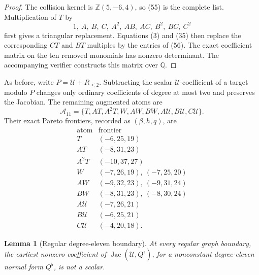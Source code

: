 \documentclass[11pt]{article}
\newtheorem{lemma}[theorem]{Lemma}
\theoremstyle{remark}
\newcommand{\Z}{\mathbb Z}
\newcommand{\Jac}{\operatorname{Jac}}
\newcommand{\cU}{\mathcal U}
\begin{document}
\begin{proof}
The collision kernel is \(\Z(5,-6,4)\), so (55) is the complete list.
Multiplication of \(T\) by
\[
1,\ A,\ B,\ C,\ A^2,\ AB,\ AC,\ B^2,\ BC,\ C^2
\]
first gives a triangular replacement.  Equations (3) and (35) then
replace the corresponding \(CT\) and \(BT\) multiples by the entries
of (56).  The exact coefficient matrix on the ten removed monomials has
nonzero determinant.  The accompanying verifier constructs this matrix
over \(\mathbb Q\).
\end{proof}

As before, write \(P=\cU+R_{\le2}\).  Subtracting the scalar
\(\cU\)-coefficient of a target modulo \(P\) changes only ordinary
coefficients of degree at most two and preserves the Jacobian.  The
remaining augmented atoms are
\[
\mathcal A_{11}=
\{T,AT,A^2T,W,AW,BW,A\cU,B\cU,C\cU\}.
\tag{57}
\]
Their exact Pareto frontiers, recorded as \((\beta,h,q)\), are
\[
\begin{array}{c|c}
\text{atom}&\text{frontier}\\ \hline
T&(-6,25,19)\\
AT&(-8,31,23)\\
A^2T&(-10,37,27)\\
W&(-7,26,19),\ (-7,25,20)\\
AW&(-9,32,23),\ (-9,31,24)\\
BW&(-8,31,23),\ (-8,30,24)\\
A\cU&(-7,26,21)\\
B\cU&(-6,25,21)\\
C\cU&(-4,20,18).
\end{array}
\tag{58}
\]

\begin{lemma}[Regular degree-eleven boundary]
\label{lem:regular-eleven}
At every regular graph boundary, the earliest nonzero coefficient of
\(\Jac(\cU,Q^\flat)\), for a nonconstant degree-eleven normal form
\(Q^\flat\), is not a scalar.
\end{lemma}
\end{document}
